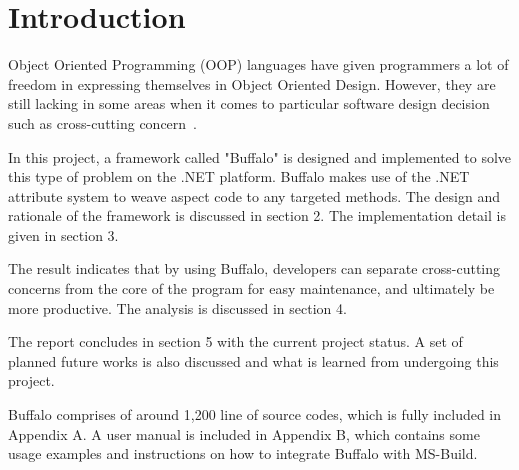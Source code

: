 \chapter{Introduction}

Object Oriented Programming (OOP) languages have given programmers a lot of freedom in expressing themselves in Object Oriented Design. However, they are still lacking in some areas when it comes to particular software design decision such as cross-cutting concern~\cite{aop}.

In this project, a framework called "Buffalo" is designed and implemented to solve this type of problem on the .NET platform. Buffalo makes use of the .NET attribute system to weave aspect code to any targeted methods. The design and rationale of the framework is discussed in section 2. The implementation detail is given in section 3.

The result indicates that by using Buffalo, developers can separate cross-cutting concerns from the core of the program for easy maintenance, and ultimately be more productive. The analysis is discussed in section 4.

The report concludes in section 5 with the current project status. A set of planned future works is also discussed and what is learned from undergoing this project.

Buffalo comprises of around 1,200 line of source codes, which is fully included in Appendix A. A user manual is included in Appendix B, which contains some usage examples and instructions on how to integrate Buffalo with MS-Build.
